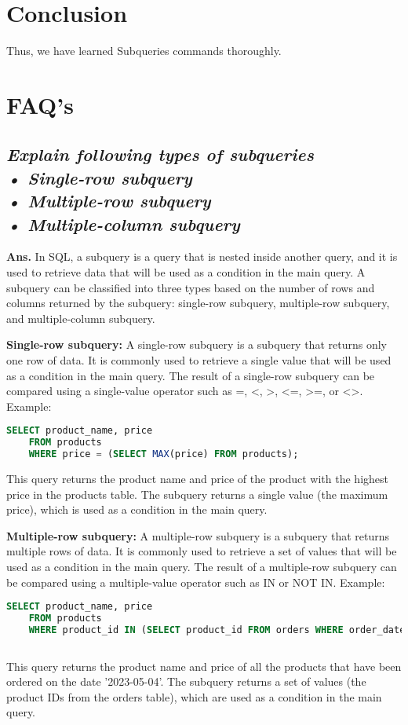 \documentclass{article}
\begin{document}
\section{\textbf{Conclusion}}
Thus, we have learned Subqueries commands thoroughly.
\section{\textbf{FAQ's}}
\subsection{\textit{Explain following types of subqueries\\
• Single-row subquery\\
• Multiple-row subquery\\
• Multiple-column subquery}}
\textbf{Ans.} In SQL, a subquery is a query that is nested inside another query, and it is used to retrieve data that will be used as a condition in the main query. A subquery can be classified into three types based on the number of rows and columns returned by the subquery: single-row subquery, multiple-row subquery, and multiple-column subquery.

\textbf{Single-row subquery:}
A single-row subquery is a subquery that returns only one row of data. It is commonly used to retrieve a single value that will be used as a condition in the main query. The result of a single-row subquery can be compared using a single-value operator such as =, <, >, <=, >=, or <>.
Example:
\begin{lstlisting}[language=SQL]
    SELECT product_name, price
    FROM products
    WHERE price = (SELECT MAX(price) FROM products);
\end{lstlisting}
This query returns the product name and price of the product with the highest price in the products table. The subquery returns a single value (the maximum price), which is used as a condition in the main query.

\textbf{Multiple-row subquery:}
A multiple-row subquery is a subquery that returns multiple rows of data. It is commonly used to retrieve a set of values that will be used as a condition in the main query. The result of a multiple-row subquery can be compared using a multiple-value operator such as IN or NOT IN.
Example:
\begin{lstlisting}[language=SQL]
    SELECT product_name, price
    FROM products
    WHERE product_id IN (SELECT product_id FROM orders WHERE order_date = '2023-05-04');
    
\end{lstlisting}
This query returns the product name and price of all the products that have been ordered on the date '2023-05-04'. The subquery returns a set of values (the product IDs from the orders table), which are used as a condition in the main query.
\end{document}
